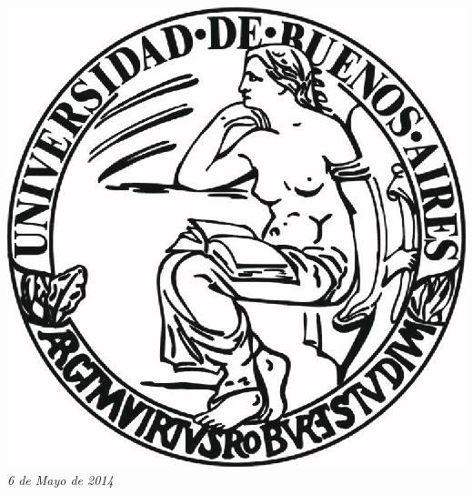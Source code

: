 \documentclass{article}
\begin{document}
\begin{titlepage}
\includegraphics[scale=0.5]{img/UBA.jpg}\\[1cm] %


{\large \text \em {6 de Mayo de 2014}}\\[3cm] %
 

\vfill %

\end{titlepage}

\tableofcontents

\newpage
\end{document}
